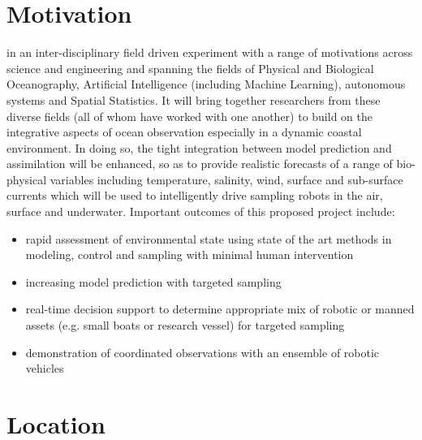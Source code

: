 \section*{Motivation}

\proj in an inter-disciplinary field driven experiment with a range of
motivations across science and engineering and spanning the fields of
Physical and Biological Oceanography, Artificial Intelligence
(including Machine Learning), autonomous systems and Spatial
Statistics. It will bring together researchers from these diverse
fields (all of whom have worked with one another) to build on the
integrative aspects of ocean observation especially in a dynamic
coastal environment.  In doing so, the tight integration between model
prediction and assimilation will be enhanced, so as to provide
realistic forecasts of a range of bio-physical variables including
temperature, salinity, wind, surface and sub-surface currents which will be used to intelligently drive sampling robots in the air, surface and
underwater. Important outcomes of this proposed project include:

\begin{itemize}[noitemsep,topsep=5pt,parsep=0pt,partopsep=0pt,leftmargin=0.5cm]

\item rapid assessment of environmental state using state of the art
  methods in modeling, control and sampling with minimal human intervention
\item increasing model prediction with targeted sampling
\item real-time decision support to determine appropriate mix of
  robotic or manned assets (e.g. small boats or research vessel) for
  targeted sampling
\item demonstration of coordinated observations with an ensemble of
  robotic vehicles
\end{itemize}

\section*{Location}

